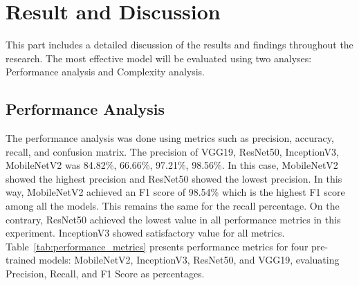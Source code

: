 \documentclass{ijcaArticle}
\begin{document}
\section{Result and Discussion}
\label{sec:result_and_discussion}

This part includes a detailed discussion of the results and findings throughout the research. The most effective model will be evaluated using two analyses: Performance analysis and Complexity analysis.

\subsection{Performance Analysis}
The performance analysis was done using metrics such as precision, accuracy, recall, and confusion matrix. The precision of VGG19, ResNet50, InceptionV3, MobileNetV2 was 84.82\%, 66.66\%, 97.21\%, 98.56\%. In this case, MobileNetV2 showed the highest precision and ResNet50 showed the lowest precision. In this way, MobileNetV2 achieved an F1 score of 98.54\% which is the highest F1 score among all the models. This remains the same for the recall percentage. On the contrary, ResNet50 achieved the lowest value in all performance metrics in this experiment. InceptionV3 showed satisfactory value for all metrics. Table~\ref{tab:performance_metrics} presents performance metrics for four pre-trained models: MobileNetV2, InceptionV3, ResNet50, and VGG19, evaluating Precision, Recall, and F1 Score as percentages.

\begin{table}[htbp]
\label{tab:performance_metrics}
\end{table}
\end{document}
